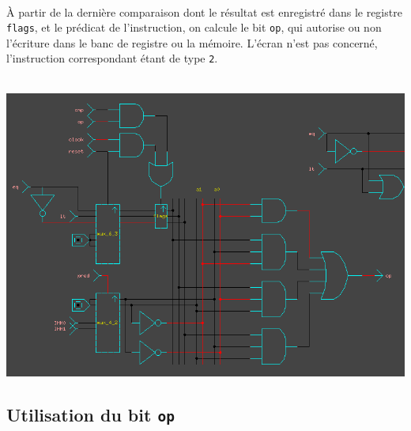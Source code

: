 \documentclass[11pt, a4paper, twoside, titlepage]{article}
\begin{document}
\paragraph{}
À partir de la dernière comparaison dont le résultat est enregistré dans le registre \texttt{flags}, et le prédicat de l'instruction, on calcule le bit \texttt{op}, qui autorise ou non l'écriture dans le banc de registre ou la mémoire. L'écran n'est pas concerné, l'instruction correspondant étant de type \texttt{2}.\\
\\
\centerline{\includegraphics[width=.8 \textwidth]{mgr_cmp}}

\subsection{Utilisation du bit \texttt{op}}
\end{document}
